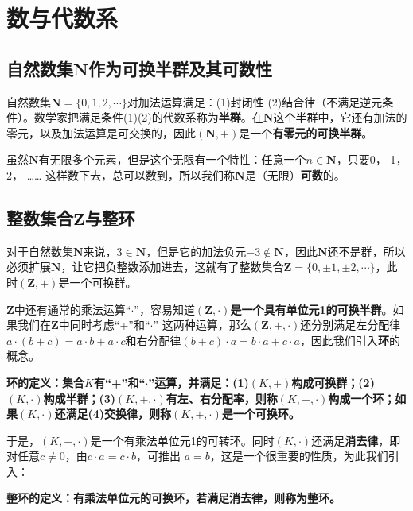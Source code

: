 \documentclass[12pt]{article}
\begin{document}
\section{数与代数系}
\subsection{自然数集$\textbf{N}$作为可换半群及其可数性}
自然数集$\textbf{N} = \{0, 1, 2, \cdots \}$对加法运算满足：(1)封闭性 (2)结合律（不满足逆元条件）。数学家把满足条件(1)(2)的代数系称为\textbf{半群}。在$\textbf{N}$这个半群中，它还有加法的零元，以及加法运算是可交换的，因此$(\textbf{N}, +)$是一个\textbf{有零元的可换半群}。

虽然$\textbf{N}$有无限多个元素，但是这个无限有一个特性：任意一个$n \in \textbf{N}$，只要0， 1， 2， …… 这样数下去，总可以数到，所以我们称$\textbf{N}$是（无限）\textbf{可数}的。

\subsection{整数集合$\textbf{Z}$与整环}
对于自然数集$\textbf{N}$来说，$3 \in \textbf{N}$，但是它的加法负元$-3 \notin \textbf{N}$，因此$\textbf{N}$还不是群，所以必须扩展$\textbf{N}$，让它把负整数添加进去，这就有了整数集合$\textbf{Z} = \{0, \pm 1, \pm 2, \cdots\}$，此时$(\textbf{Z}, +)$是一个可换群。

$\textbf{Z}$中还有通常的乘法运算“$\cdot$”，容易知道$(\textbf{Z}, \cdot)$\textbf{是一个具有单位元1的可换半群}。如果我们在$\textbf{Z}$中同时考虑“+”和“$\cdot$” 这两种运算，那么$(\textbf{Z}, +, \cdot)$还分别满足左分配律$a \cdot (b + c) = a \cdot b + a \cdot c$和右分配律$(b + c) \cdot a = b \cdot a + c \cdot a$，因此我们引入\textbf{环}的概念。

\begin{mdframed}[
linecolor=black!40,outerlinewidth=1pt,roundcorner=.5em,innertopmargin=1ex,innerbottommargin=.5\baselineskip,innerrightmargin=1em,innerleftmargin=1em,backgroundcolor=gray!5,
]
\textbf{
环的定义：集合$K$有“+”和“$\cdot$”运算，并满足：(1)$(K, +)$构成可换群；(2)$(K, \cdot)$构成半群；(3)$(K, +, \cdot)$有左、右分配率，则称$(K, +, \cdot)$构成一个环；如果$(K, \cdot)$还满足(4)交换律，则称$(K, +, \cdot)$是一个可换环。
}
\end{mdframed}

于是，$(K, +, \cdot)$是一个有乘法单位元1的可转环。同时$(K, \cdot)$还满足\textbf{消去律}，即对任意$c \neq 0$，由$c \cdot a = c \cdot b$，可推出 $a = b$，这是一个很重要的性质，为此我们引入：
\begin{mdframed}[
linecolor=black!40,outerlinewidth=1pt,roundcorner=.5em,innertopmargin=1ex,innerbottommargin=.5\baselineskip,innerrightmargin=1em,innerleftmargin=1em,backgroundcolor=gray!5,
]
\textbf{
整环的定义：有乘法单位元的可换环，若满足消去律，则称为整环。
}
\end{mdframed}
\end{document}
